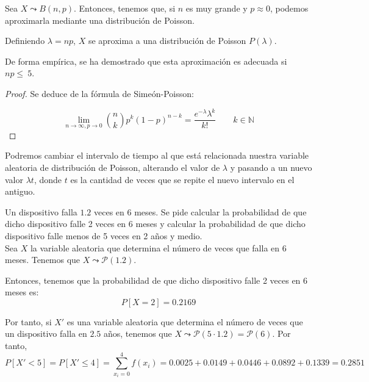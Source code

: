 \begin{prop}
    Sea $X\leadsto B(n,p)$. Entonces, tenemos que, si $n$ es muy grande y $p\approx 0$, podemos aproximarla mediante una distribución de Poisson.
    
    Definiendo $\lambda=np$, $X$ se aproxima a una distribución de Poisson $P(\lambda)$.

    De forma empírica, se ha demostrado que esta aproximación es adecuada si $np\leq~5$.
    
\end{prop}
\begin{proof}

    Se deduce de la fórmula de Simeón-Poisson:
    
    \begin{equation*}
        \lim_{n\to \infty,p\to 0}\binom{n}{k}p^k(1-p)^{n-k} = \frac{e^{-\lambda}\lambda^k}{k!} \qquad k\in \mathbb{N}
    \end{equation*}
\end{proof}


\begin{observacion}
    Podremos cambiar el intervalo de tiempo al que está relacionada nuestra variable aleatoria de distribución de Poisson, alterando el valor de $\lambda$ y pasando a un nuevo valor $\lambda t$, donde $t$ es la cantidad de veces que se repite el nuevo intervalo en el antiguo.
\end{observacion}
\begin{ejemplo}
    Un dispositivo falla $1.2$ veces en 6 meses. Se pide calcular la probabilidad de que dicho dispositivo falle 2 veces en 6 meses y calcular la probabilidad de que dicho dispositivo falle menos de 5 veces en 2 años y medio.\\

    Sea $X$ la variable aleatoria que determina el número de veces que falla en 6 meses. Tenemos que $X\leadsto \mathcal{P}(1.2)$.

    Entonces, tenemos que la probabilidad de que dicho dispositivo falle 2 veces en 6 meses es:
    \begin{equation*}
        P[X=2]=0.2169
    \end{equation*}

    Por tanto, si $X'$ es una variable aleatoria que determina el número de veces que un dispositivo falla en $2.5$ años, tenemos que $X\leadsto \mathcal{P}(5\cdot 1.2)=\mathcal{P}(6)$. Por tanto,
    \begin{equation*}
        P[X'< 5] =P[X'\leq 4]=\sum_{x_i=0}^4f(x_i) = 0.0025 + 0.0149 + 0.0446 +0.0892+0.1339=0.2851
    \end{equation*}
\end{ejemplo}